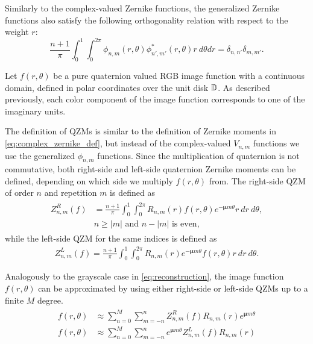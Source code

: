 Similarly to the complex-valued Zernike functions, the generalized Zernike functions also satisfy the following orthogonality relation with respect to the weight $r$:
\begin{equation}\label{QZortho}
	\frac{n+1}{\pi} \int_0^1 \int_0^{2\pi} \phi_{n,m}(r,\theta) \phi^*_{n',m'}(r,\theta) r \ d\theta dr = \delta_{n,n'}\delta_{m,m'}.
\end{equation}


Let $f(r,\theta)$ be a pure quaternion valued RGB image function with a continuous domain, defined in polar coordinates over the unit disk $\mathbb{D}$. As described previously, each color component of the image function corresponds to one of the imaginary units.


The definition of QZMs is similar to the definition of Zernike moments in \eqref{eq:complex_zernike_def}, but instead of the complex-valued $V_{n,m}$ functions we use the generalized $\phi_{n,m}$ functions. Since the multiplication of quaternion is not commutative, both right-side and left-side quaternion Zernike moments can be defined, depending on which side we multiply $f(r,\theta)$ from. The right-side QZM of order $n$ and repetition $m$ is defined as
\begin{gather}
    \begin{split}
    Z_{n,m}^R(f) &= \frac{n + 1}{\pi}\int_0^1\int_0^{2\pi}R_{n,m}(r)f(r,\theta)e^{-\bm{\mu}m\theta}r\ dr\ d\theta, \\
    &n \geq |m| \text{  and  } n - |m| \text{  is even,}
    \end{split}
    \label{eq:QZRM}
\end{gather}
while the left-side QZM for the same indices is defined as 
\begin{gather*}
Z_{n,m}^L(f) = \frac{n + 1}{\pi}\int_0^1\int_0^{2\pi}R_{n,m}(r)e^{-\bm{\mu}m\theta}f(r,\theta)r\ dr\ d\theta.
\end{gather*}


Analogously to the grayscale case in \eqref{eq:reconstruction}, the image function $f(r,\theta)$ can be approximated by using either right-side or left-side QZMs up to a finite $M$ degree. 
\begin{gather}
    \begin{split}
      f(r,\theta) &\approx \sum_{n=0}^{M}\sum_{m=-n}^{n}Z_{n,m}^R(f)R_{n,m}(r)e^{\bm{\mu}m\theta} \\
      f(r,\theta) &\approx \sum_{n=0}^{M}\sum_{m=-n}^{n}e^{\bm{\mu}m\theta}Z_{n,m}^L(f)R_{n,m}(r)
    \end{split}\label{eq:qzm_reconstruction}
\end{gather}


